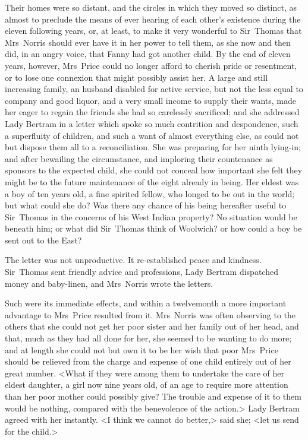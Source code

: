 Their homes were so distant, and the circles in which they moved so distinct, as almost to preclude the means of ever hearing of each other's existence during the eleven following years, or, at least, to make it very wonderful to Sir~Thomas that Mrs~Norris should ever have it in her power to tell them, as she now and then did, in an angry voice, that Fanny had got another child. By the end of eleven years, however, Mrs~Price could no longer afford to cherish pride or resentment, or to lose one connexion that might possibly assist her. A large and still increasing family, an husband disabled for active service, but not the less equal to company and good liquor, and a very small income to supply their wants, made her eager to regain the friends she had so carelessly sacrificed; and she addressed Lady Bertram in a letter which spoke so much contrition and despondence, such a superfluity of children, and such a want of almost everything else, as could not but dispose them all to a reconciliation. She was preparing for her ninth lying-in; and after bewailing the circumstance, and imploring their countenance as sponsors to the expected child, she could not conceal how important she felt they might be to the future maintenance of the eight already in being. Her eldest was a boy of ten years old, a fine spirited fellow, who longed to be out in the world; but what could she do? Was there any chance of his being hereafter useful to Sir~Thomas in the concerns of his West Indian property? No situation would be beneath him; or what did Sir~Thomas think of Woolwich? or how could a boy be sent out to the East?

The letter was not unproductive. It re-established peace and kindness. Sir~Thomas sent friendly advice and professions, Lady Bertram dispatched money and baby-linen, and Mrs~Norris wrote the letters.

Such were its immediate effects, and within a twelvemonth a more important advantage to Mrs~Price resulted from it. Mrs~Norris was often observing to the others that she could not get her poor sister and her family out of her head, and that, much as they had all done for her, she seemed to be wanting to do more; and at length she could not but own it to be her wish that poor Mrs~Price should be relieved from the charge and expense of one child entirely out of her great number. <What if they were among them to undertake the care of her eldest daughter, a girl now nine years old, of an age to require more attention than her poor mother could possibly give? The trouble and expense of it to them would be nothing, compared with the benevolence of the action.> Lady Bertram agreed with her instantly. <I think we cannot do better,> said she; <let us send for the child.>


